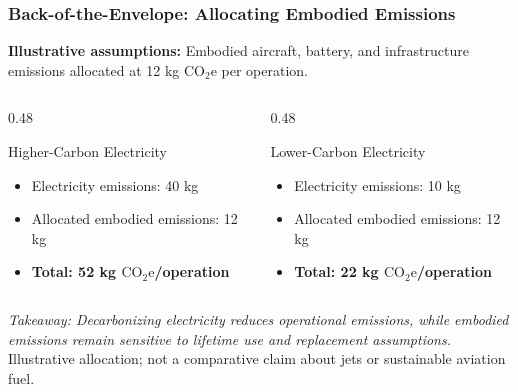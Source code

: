 \documentclass{beamer}
\begin{document}
\begin{frame}[t,shrink=11]
\frametitle{Back-of-the-Envelope: Allocating Embodied Emissions}
\textbf{Illustrative assumptions:} Embodied aircraft, battery, and infrastructure emissions allocated at 12 kg $\mathrm{CO_2e}$ per operation.
\begin{columns}[T]
\begin{column}{0.48\textwidth}\begin{block}{Higher-Carbon Electricity}
\begin{itemize}
\item Electricity emissions: 40 kg
\item Allocated embodied emissions: 12 kg
\item \textbf{Total: 52 kg $\mathrm{CO_2e}$/operation}
\end{itemize}\end{block}\end{column}
\begin{column}{0.48\textwidth}\begin{block}{Lower-Carbon Electricity}
\begin{itemize}
\item Electricity emissions: 10 kg
\item Allocated embodied emissions: 12 kg
\item \textbf{Total: 22 kg $\mathrm{CO_2e}$/operation}
\end{itemize}\end{block}\end{column}
\end{columns}
\textit{Takeaway: Decarbonizing electricity reduces operational emissions, while embodied emissions remain sensitive to lifetime use and replacement assumptions.}
\vfill{\tiny Illustrative allocation; not a comparative claim about jets or sustainable aviation fuel.}
\end{frame}
\end{document}
